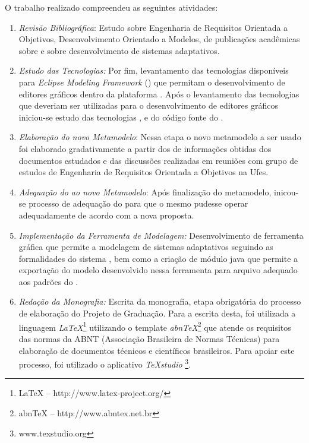 O trabalho realizado compreendeu as seguintes atividades:


\begin{enumerate}
	
	\item \textit{Revisão Bibliográfica}: Estudo sobre Engenharia de Requisitos Orientada a Objetivos, Desenvolvimento Orientado a Modelos, de publicações acadêmicas sobre \zanshin e sobre desenvolvimento de sistemas adaptativos. 
	
	\item \textit{Estudo das Tecnologias:} Por fim, levantamento das tecnologias disponíveis para \textit{Eclipse Modeling Framework} (\emf) que permitam o desenvolvimento de editores gráficos dentro da plataforma \eclipse. Após o levantamento das tecnologias que deveriam ser utilizadas para o desenvolvimento de editores gráficos iniciou-se estudo das tecnologias \emf, \sirius e do código fonte do \zanshin.
	
	\item \textit{Elaboração do novo Metamodelo}: Nessa etapa o novo metamodelo a ser usado foi elaborado gradativamente a partir dos de informações obtidas dos documentos estudados e das discussões realizadas em reuniões com grupo de estudos de Engenharia de Requisitos Orientada a Objetivos na Ufes.
	
	\item \textit{Adequação do \zanshin ao novo Metamodelo}: Após finalização do metamodelo, inicou-se processo de adequação do \framework para que o mesmo pudesse operar adequadamente de acordo com a nova proposta.
	
	\item \textit{Implementação da Ferramenta de Modelagem:} Desenvolvimento de ferramenta gráfica que permite a modelagem de sistemas adaptativos seguindo as formalidades do sistema \zanshin, bem como a criação de módulo java que permite a exportação do modelo desenvolvido nessa ferramenta para arquivo \xml adequado aos padrões do \framework.
	
	\item \textit{Redação da Monografia:} Escrita da monografia, etapa obrigatória do processo de elaboração do Projeto de Graduação. Para a escrita desta, foi utilizada a linguagem \textit{LaTeX}\footnote{LaTeX -- http://www.latex-project.org/} utilizando o template \textit{abnTeX}\footnote{abnTeX -- http://www.abntex.net.br} que atende os requisitos das normas da ABNT (Associação Brasileira de Normas Técnicas) para elaboração de documentos técnicos e científicos brasileiros. Para apoiar este processo, foi utilizado o aplicativo \textit{TeXstudio} \footnote{www.texstudio.org}.
	
\end{enumerate}


